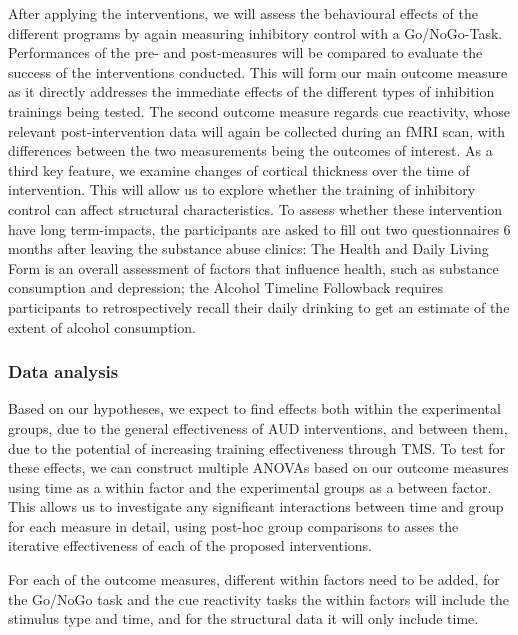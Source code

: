 \documentclass[12pt]{article}
\begin{document}
After applying the interventions, we will assess the behavioural effects of the different programs by again measuring inhibitory control with a Go/NoGo-Task. Performances of the pre- and post-measures will be compared to evaluate the success of the interventions conducted. This will form our main outcome measure as it directly addresses the immediate effects of the different types of inhibition trainings being tested.
The second outcome measure regards cue reactivity, whose relevant post-intervention data will again be collected during an fMRI scan, with differences between the two measurements being the outcomes of interest.
As a third key feature, we examine changes of cortical thickness over the time of intervention. This will allow us to explore whether the training of inhibitory control can affect structural characteristics.
To assess whether these intervention have long term-impacts, the participants are asked to fill out two questionnaires 6 months after leaving the substance abuse clinics: The Health and Daily Living Form \parencite{moosHealthDailyLiving1986} is an overall assessment of factors that influence health, such as substance consumption and depression; the Alcohol Timeline Followback \parencite{sobellAlcoholTimelineFollowback1995} requires participants to retrospectively recall their daily drinking to get an estimate of the extent of alcohol consumption.

\subsubsection{Data analysis}

Based on our hypotheses, we expect to find effects both within the experimental groups, due to the general effectiveness of AUD interventions, and between them, due to the potential of increasing training effectiveness through TMS. To test for these effects, we can construct multiple ANOVAs based on our outcome measures using time as a within factor and the experimental groups as a between factor. This allows us to investigate any significant interactions between time and group for each measure in detail, using post-hoc group comparisons to asses the iterative effectiveness of each of the proposed interventions.

For each of the outcome measures, different within factors need to be added, for the Go/NoGo task and the cue reactivity tasks the within factors will include the stimulus type and time, and for the structural data it will only include time.
\end{document}
